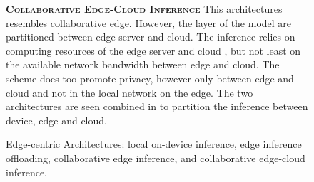 \begin{figure}
\begin{minipage}{0.3\linewidth}
\begin{figure}
		\end{figure}
	\end{minipage}
	\begin{minipage}{0.5\linewidth}
		\centering
		\captionsetup[subfigure]{justification=centering}
		\begin{figure}
			\centering
		\end{figure}
	\end{minipage}
	\hfill
	\begin{minipage}{0.45\linewidth}
		\textbf{\protect{} \textsc{Collaborative Edge-Cloud Inference}}
		\color{caption-color} \newline
		This architectures resembles collaborative edge. However, the layer of the model are partitioned between edge server and cloud. The inference relies on computing resources of the edge server and cloud , but not least on the available network bandwidth between edge and cloud. The scheme does too promote privacy, however only between edge and cloud and not in the local network on the edge. The two architectures are seen combined in \cite{} to partition the inference between device, edge and cloud.
	\end{minipage}
	\caption[Edge-centric Architectures]{Edge-centric Architectures: \protect{} local on-device inference, \protect{} edge inference offloading, \protect{} collaborative edge inference, and \protect{}  collaborative edge-cloud inference. }
	\label{fig:edge_arch}
\end{figure}

